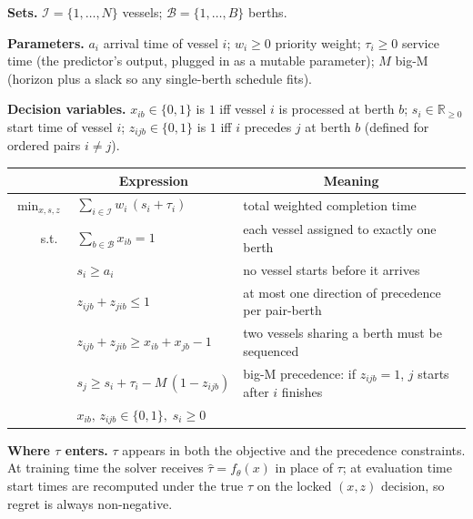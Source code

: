 \documentclass[11pt]{article}
\begin{document}
\vspace{0.5em}

\noindent\textbf{Sets.}
$\mathcal{I}=\{1,\dots,N\}$ vessels;\;
$\mathcal{B}=\{1,\dots,B\}$ berths.

\smallskip
\noindent\textbf{Parameters.}
$a_i$ arrival time of vessel $i$;\;
$w_i\geq 0$ priority weight;\;
$\tau_i\geq 0$ service time (the predictor's output, plugged in as a
mutable parameter);\;
$M$ big-M (horizon plus a slack so any single-berth schedule fits).

\smallskip
\noindent\textbf{Decision variables.}
$x_{ib}\in\{0,1\}$ is $1$ iff vessel $i$ is processed at berth $b$;\;
$s_i\in\mathbb{R}_{\geq 0}$ start time of vessel $i$;\;
$z_{ijb}\in\{0,1\}$ is $1$ iff $i$ precedes $j$ at berth $b$ (defined
for ordered pairs $i\neq j$).

\vspace{0.4em}

\begin{center}
\renewcommand{\arraystretch}{1.35}
\begin{tabular}{@{}r l l@{}}
\toprule
& \multicolumn{1}{c}{Expression} & \multicolumn{1}{c}{Meaning} \\
\midrule
$\displaystyle\min_{x,s,z}$ &
$\displaystyle\sum_{i\in\mathcal{I}} w_i\,(s_i + \tau_i)$ &
total weighted completion time \\
\midrule
s.t.\ &
$\displaystyle\sum_{b\in\mathcal{B}} x_{ib} = 1$ &
each vessel assigned to exactly one berth \\
&
$s_i \geq a_i$ &
no vessel starts before it arrives \\
&
$z_{ijb} + z_{jib} \leq 1$ &
at most one direction of precedence per pair-berth \\
&
$z_{ijb} + z_{jib} \geq x_{ib} + x_{jb} - 1$ &
two vessels sharing a berth must be sequenced \\
&
$s_j \geq s_i + \tau_i - M\,(1 - z_{ijb})$ &
big-M precedence: if $z_{ijb}{=}1$, $j$ starts after $i$ finishes \\
&
$x_{ib},\, z_{ijb} \in \{0,1\},\; s_i \geq 0$ & \\
\bottomrule
\end{tabular}
\end{center}

\vspace{0.6em}

\noindent\textbf{Where $\tau$ enters.}
$\tau$ appears in both the objective and the precedence constraints.
At training time the solver receives $\hat{\tau}=f_\theta(x)$ in place
of $\tau$; at evaluation time start times are recomputed under the
true $\tau$ on the locked $(x,z)$ decision, so regret is always
non-negative.
\end{document}
